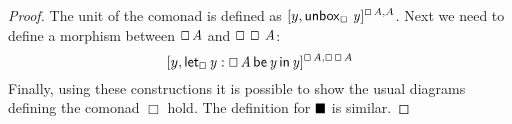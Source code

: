 \begin{proof}
  The unit of the comonad is defined as $[ y,\mathsf{unbox}_\oblong\, \, \mathit{y} ]^{\oblong \, \mathit{A},A}$.  Next we need to define a morphism between $\oblong \, \mathit{A}$ and $\oblong \, \oblong \, \mathit{A}$:
  \[
  [y, \mathsf{let}_\oblong\, \mathit{y}  :  \oblong \, \mathit{A} \,\mathsf{be}\, \mathit{y} \,\mathsf{in}\, \mathit{y}  ]^{\oblong \, \mathit{A},\oblong \, \oblong \, \mathit{A}}
  \]
  Finally, using these constructions it is possible to show the usual
  diagrams defining the comonad $\Box$ hold.  The definition for
  $\blacksquare$ is similar.
\end{proof}

